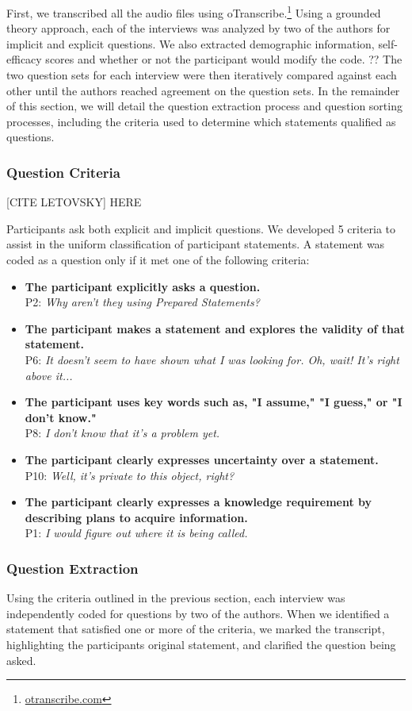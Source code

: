 \documentclass[conference]{IEEEtran}
\begin{document}
First, we transcribed all the audio files using oTranscribe.\footnote{\url{otranscribe.com}}
Using a grounded theory approach, each of the interviews was analyzed by two of the authors for implicit and explicit questions. 
We also extracted demographic information, self-efficacy scores and whether or not the participant would modify the code. ?? The two question sets for each interview were then iteratively compared against each other until the authors reached agreement on the question sets. 
In the remainder of this section, we will detail the question extraction process and question sorting processes, including the criteria used to determine which statements qualified as questions.
\subsubsection{Question Criteria}
[CITE LETOVSKY] HERE

Participants ask both explicit and implicit questions. We developed 5 criteria to assist in the uniform classification of participant statements. A statement was coded as a question only if it met one of the following criteria:

\begin{itemize}
\item \textbf{The participant explicitly asks a question.}
\\ P2: \textit{Why aren't they using Prepared Statements?}
\item \textbf{The participant makes a statement and explores the validity of that statement.}
\\ P6: \textit{It doesn't seem to have shown what I was looking for. Oh, wait! It's right above it...}
\item \textbf{The participant uses key words such as, "I assume," "I guess," or "I don't know."}
\\ P8: \textit{I don't know that it's a problem yet.}
\item \textbf{The participant clearly expresses uncertainty over a statement.}
\\ P10: \textit{Well, it's private to this object, right?}
\item \textbf{The participant clearly expresses a knowledge requirement by describing plans to acquire information.}
\\ P1: \textit{I would figure out where it is being called.}

\end{itemize}

\subsubsection{Question Extraction}
Using the criteria outlined in the previous section, each interview was independently coded for questions by two of the authors. 
When we identified a statement that satisfied one or more of the criteria, we marked the transcript, highlighting the participants original statement, and clarified the question being asked.
\end{document}
